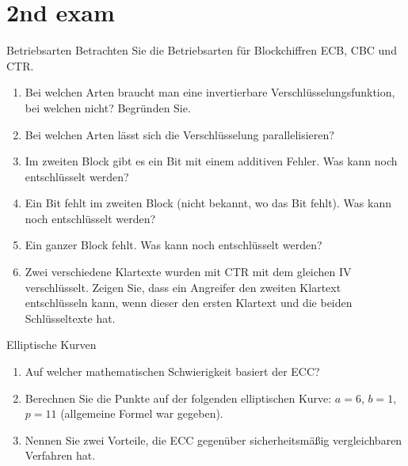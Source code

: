 \documentclass{article}
\begin{document}



\setcounter{section}{2022}
\section{2nd exam}

\begin{exercise}{Betriebsarten}
  Betrachten Sie die Betriebsarten für Blockchiffren ECB, CBC und CTR.

  \begin{enumerate}
    \item Bei welchen Arten braucht man eine invertierbare Verschlüsselungsfunktion, bei welchen nicht? Begründen Sie.
    \item Bei welchen Arten lässt sich die Verschlüsselung parallelisieren?
    \item Im zweiten Block gibt es ein Bit mit einem additiven Fehler. Was kann noch entschlüsselt werden?
    \item Ein Bit fehlt im zweiten Block (nicht bekannt, wo das Bit fehlt). Was kann noch entschlüsselt werden?
    \item Ein ganzer Block fehlt. Was kann noch entschlüsselt werden?
    \item Zwei verschiedene Klartexte wurden mit CTR mit dem gleichen IV verschlüsselt. Zeigen Sie, dass ein Angreifer den zweiten Klartext entschlüsseln kann, wenn dieser den ersten Klartext und die beiden Schlüsseltexte hat.
  \end{enumerate}

  \begin{solution}
  \end{solution}
\end{exercise}

\begin{exercise}{Elliptische Kurven}
  \begin{enumerate}
    \item Auf welcher mathematischen Schwierigkeit basiert der ECC?
    \item Berechnen Sie die Punkte auf der folgenden elliptischen Kurve: $a = 6$, $b = 1$, $p = 11$ (allgemeine Formel war gegeben).
    \item Nennen Sie zwei Vorteile, die ECC gegenüber sicherheitsmäßig vergleichbaren Verfahren hat.
  \end{enumerate}

  \begin{solution}
  \end{solution}
\end{exercise}
\end{document}
